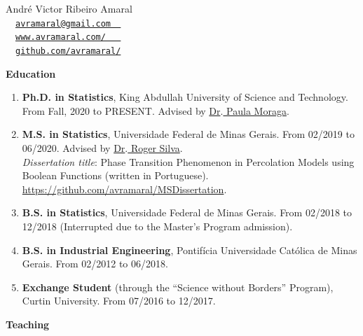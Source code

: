 \documentclass[11pt, ]{article}
\begin{document}
	
	\begin{center}
		{\LARGE André Victor Ribeiro Amaral} \\ \vspace{6pt}
		{\small\faEnvelope~~\href{mailto:avramaral@gmail.com}{\texttt{avramaral@gmail.com~~}}} \\
		{\small\faDesktop~~\href{https://www.avramaral.com/}{\texttt{www.avramaral.com/~~~}}}	\\
		{\small\faGithubAlt~~\href{https://github.com/avramaral/}{\texttt{github.com/avramaral/}}}	
	\end{center}

{\Large \textbf{Education}}

	\begin{enumerate}
		\item \textbf{Ph.D. in Statistics}, King Abdullah University of Science and Technology. From Fall, 2020 to PRESENT. Advised by \href{https://www.paulamoraga.com/}{Dr$\text{.}$ Paula Moraga}.
		
		\item \textbf{M.S. in Statistics}, Universidade Federal de Minas Gerais. From 02/2019 to 06/2020. Advised by \href{http://www.est.ufmg.br/~rogerwcs/}{Dr$\text{.}$ Roger Silva}. \\
		\textit{Dissertation title}: Phase Transition Phenomenon in Percolation Models using Boolean Functions (written in Portuguese). \href{https://github.com/avramaral/MSDissertation}{https://github.com/avramaral/MSDissertation}.
		
		\item \textbf{B.S. in Statistics}, Universidade Federal de Minas Gerais. From 02/2018 to 12/2018 (Interrupted due to the Master's Program admission).
		
		\item \textbf{B.S. in Industrial Engineering}, Pontifícia Universidade Católica de Minas Gerais. From 02/2012 to 06/2018.
		
		\item \textbf{Exchange Student} (through the ``Science without Borders'' Program), Curtin University. From 07/2016 to 12/2017.
	\end{enumerate}

\vspace{6pt}

{\Large \textbf{Teaching}}
\end{document}
